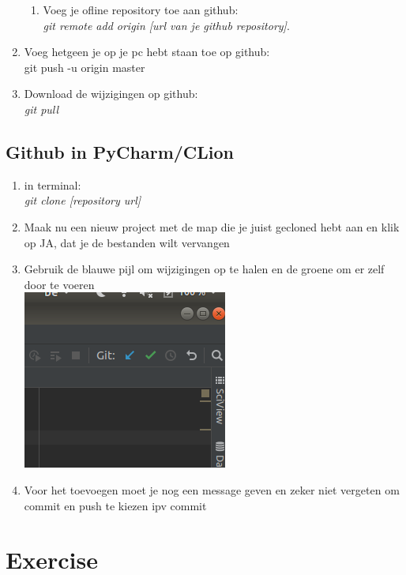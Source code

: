 \documentclass[a4paper]{article}
\begin{document}
\begin{enumerate}
\begin{enumerate}
					\item Voeg je ofline repository toe aan github:\\ \textit{git remote add origin [url van je github repository]}.
				\end{enumerate}
				
				\item Voeg hetgeen je op je pc hebt staan toe op github:\\ git push -u origin master
				
				\item Download de wijzigingen op github:\\ \textit{git pull}
			\end{enumerate}
		
		\subsection{Github in PyCharm/CLion}
		\begin{enumerate}
			\item in terminal:\\ \textit{git clone [repository url]}
			\item Maak nu een nieuw project met de map die je juist gecloned hebt aan en klik op JA, dat je de bestanden wilt vervangen
			
			\item Gebruik de blauwe pijl om wijzigingen op te halen en de groene om er zelf door te voeren\\ \includegraphics[scale=0.3]{img/pushpull}
			
			\item Voor het toevoegen moet je nog een message geven en zeker niet vergeten om commit en push te kiezen ipv commit
		\end{enumerate}

	\section{Exercise}
\end{document}
